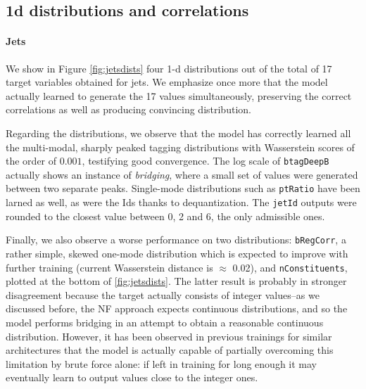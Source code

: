 \subsection{1d distributions and correlations}


\paragraph{Jets}

We show in Figure \ref{fig:jetsdists} four 1-d distributions out of the total of 17 target variables obtained for jets. We emphasize once more that the model actually learned to generate the 17 values simultaneously, preserving the correct correlations as well as producing convincing distribution.

Regarding the distributions, we observe that the model has correctly learned all the multi-modal, sharply peaked tagging distributions with Wasserstein scores of the order of $0.001$, testifying good convergence. The log scale of \texttt{btagDeepB} actually shows an instance of \emph{bridging}, where a small set of values were generated between two separate peaks. Single-mode distributions such as \texttt{ptRatio} have been larned as well, as were the Ids thanks to dequantization. The \texttt{jetId} outputs were rounded to the closest value between 0, 2 and 6, the only admissible ones.

Finally, we also observe a worse performance on two distributions: \texttt{bRegCorr}, a rather simple, skewed one-mode distribution which is expected to improve with further training (current Wasserstein distance is $\approx$ 0.02), and \texttt{nConstituents}, plotted at the bottom of \ref{fig:jetsdists}. The latter result is probably in stronger disagreement because the target actually consists of integer values--as we discussed before, the NF approach expects continuous distributions, and so the model performs bridging in an attempt to obtain a reasonable continuous distribution. However, it has been observed in previous trainings for similar architectures that the model is actually capable of partially overcoming this limitation by brute force alone: if left in training for long enough it may eventually learn to output values close to the integer ones.

